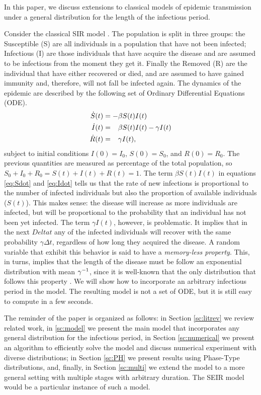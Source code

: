 \documentclass[twoside,USenglish,10pt]{article}
\newcommand{\gami}{\ensuremath\gamma^{-1}\xspace}
\newcommand{\phm}{\ensuremath\phantom{-}\xspace}
\begin{document}
In this paper, we discuss extensions to classical models of epidemic transmission under a general distribution for the length of the infectious period.

Consider the classical SIR model \cite{kerm.mcke27,murr07,chas09}. The population is split in three groups: the Susceptible (S) are all individuals in a population that have not been infected; Infectious (I) are those individuals that have acquire the disease and are assumed to be infectious from the moment they get it. Finally the Removed (R) are the individual that have either recovered or died, and are assumed to have gained immunity and, therefore, will not fall be infected again.
The dynamics of the epidemic are described by the following set of Ordinary Differential Equations (ODE).
\begin{subequations}
	\begin{align}
		\dot{S}(t) &= -\beta S(t)I(t)  \label{eq:Sdot} \\
		\dot{I}(t) &= \phm\beta S(t)I(t) - \gamma I(t) \label{eq:Idot}  \\
		\dot{R}(t) &= \phm\gamma I(t), \label{eq:Rdot}
	\end{align}
\end{subequations}
subject to initial conditions $I(0)=I_0$, $S(0)=S_0$, and $R(0)=R_0$. The previous quantities are measured as percentage of the total population, so $S_0+I_0+R_0=S(t)+I(t)+R(t)=1$.
The term $\beta S(t)I(t)$ in equations \eqref{eq:Sdot} and \eqref{eq:Idot} tells us that the rate of new infections is proportional to the number of infected individuals but also the proportion of available individuals ($S(t)$).
This makes sense: the disease will increase as more individuals are infected, but will be proportional to the probability that an individual has not been yet infected. 
The term $\gamma I(t)$, however, is problematic. It implies that in the next $Delta t$ any of the infected individuals will recover with the same probability $\gamma \Delta t$, regardless of how long they acquired the disease.
A random variable that exhibit this behavior is said to have a \emph{memory-less property}.
This, in turns, implies that the length of the disease must be follow an exponential distribution with mean $\gami$, since it is well-known that the only distribution that follows this property \cite{kulk95}.
We will show how to incorporate an arbitrary infectious period in the model. The resulting model is not a set of ODE, but it is still easy to compute in a few seconds.

The reminder of the paper is organized as follows: in Section \ref{sc:litrev} we review related work, in \ref{sc:model} we present the main model that incorporates any general distribution for the infectious period, in Section \ref{sc:numerical} we present an algorithm to efficiently solve the model and discuss numerical experiment with diverse distributions; in Section \ref{sc:PH} we present results using Phase-Type distributions, and, finally, in Section \ref{sc:multi} we extend the model to a more general setting with multiple stages with arbitrary duration. The SEIR model would be a particular instance of such a model. 
\end{document}
